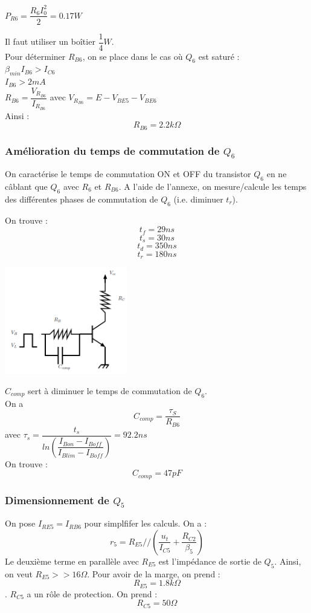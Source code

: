 \documentclass[a4paper]{report}
\begin{document}
$P_{R6} = \dfrac{R_6 I_0^{2}}{2} = 0.17 W$

Il faut utiliser un boîtier $\dfrac{1}{4}W.$\\

Pour déterminer $R_{B6}$, on se place dans le cas où $Q_6$ est saturé :\\
$\beta_{min} I_{B6} > I_{C6}$\\
$I_{B6} > 2mA$\\
$R_{B6} = \dfrac{V_{R_{B6}}}{I_{R_{B6}}}$ avec $V_{R_{B6}} = E - V_{BE5} - V_{BE6}$\\
Ainsi : $$R_{B6} = 2.2k\Omega$$

\subsubsection{Amélioration du temps de commutation de $Q_6$}
On caractérise le temps de commutation ON et OFF du transistor $Q_6$ en ne câblant que $Q_6$ avec $R_6$ et $R_{B6}$. A l'aide de l'annexe, on mesure/calcule les temps des différentes phases de commutation de $Q_6$ (i.e. diminuer $t_r$).

On trouve :
$$t_f = 29ns$$
$$t_s = 30ns$$
$$t_d = 350ns$$
$$t_r = 180ns$$

\begin{center}
\includegraphics[width=0.4\textwidth]{commutation_Q6.PNG}
\end{center}

$C_{comp}$ sert à diminuer le temps de commutation de $Q_6$.\\
On a $$C_{comp} = \dfrac{\tau_S}{R_{B6}}$$
avec $\tau_s = \dfrac{t_s}{ln(\dfrac{I_{Bon}-I_{Boff}}{I_{Blim}-I_{Boff}})} = 92.2ns$\\

On trouve : $$C_{comp} = 47pF$$

\subsubsection{Dimensionnement de $Q_5$}

On pose $I_{RE5} = I_{RB6}$ pour simplfifer les calculs. On a :
$$r_5 = R_{E5} // (\dfrac{u_t}{I_{C5}} + \dfrac{R_{C2}}{\beta_5})$$
Le deuxième terme en parallèle avec $R_{E5}$ est l'impédance de sortie de $Q_5$. Ainsi, on veut $R_{E5} >> 16\Omega$. Pour avoir de la marge, on prend : 
$$R_{E5} = 1.8k\Omega$$.
$R_{C5}$ a un rôle de protection. On prend :
$$R_{C5} = 50\Omega$$
\end{document}
